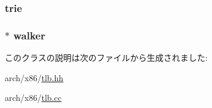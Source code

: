 \label{classX86ISA_1_1TLB_a4651b9a4f432960d77d8e3d30175aab3}
\hypertarget{classX86ISA_1_1TLB_aac73611ce3ddb38006a5c03e6ba91977}{
\subsubsection[{trie}]{ {\bf trie}}}
\label{classX86ISA_1_1TLB_aac73611ce3ddb38006a5c03e6ba91977}
\hypertarget{classX86ISA_1_1TLB_a54537e5fcbe2d6f609ca4c90a48a06a8}{
\subsubsection[{walker}]{$\ast$ {\bf walker}}}
\label{classX86ISA_1_1TLB_a54537e5fcbe2d6f609ca4c90a48a06a8}


このクラスの説明は次のファイルから生成されました:\begin{DoxyCompactItemize}
\item 
arch/x86/\hyperlink{arch_2x86_2tlb_8hh}{tlb.hh}\item 
arch/x86/\hyperlink{arch_2x86_2tlb_8cc}{tlb.cc}\end{DoxyCompactItemize}
